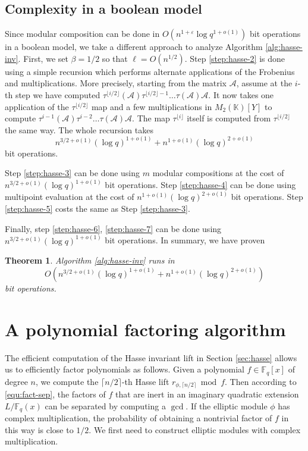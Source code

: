 \documentclass[12pt]{article}
\theoremstyle{plain}
\newtheorem{theorem}{Theorem}
\theoremstyle{definition}
\def\F{\ensuremath{\mathbb{F}}}
\def\K{\ensuremath{\mathbb{K}}}
\begin{document}
\subsection{Complexity in a boolean model}

Since modular composition can be done in $O(n^{1 + \varepsilon}\log q^{1 + o(1)})$ bit operations 
in a boolean model, we take a different approach to analyze Algorithm \ref{alg:hasse-inv}. First,  
we set $\beta = 1/2$ so that $\ell = O(n^{1/2})$. Step \ref{step:hasse-2} is done using a simple 
recursion which performs alternate applications of the Frobenius and multiplications. More 
precisely, starting from the matrix $\mathcal{A}$, assume at the $i$-th step we have computed 
$\tau^{\lfloor i/2 \rfloor}(\mathcal{A}) \tau^{\lfloor i/2 \rfloor-1} \ldots \tau(\mathcal{A}) 
\mathcal{A}$. It now takes one application of the $\tau^{\lfloor i/2 \rfloor}$ map and a few 
multiplications in $M_2(\K)[Y]$ to compute $\tau^{i-1}(\mathcal{A}) \tau^{i-2} \ldots 
\tau(\mathcal{A}) \mathcal{A}$. The map $\tau^{\lfloor i \rfloor}$ itself is computed from
$\tau^{\lfloor i/2 \rfloor}$ the same way. The whole recursion takes
\[ n^{3/2+o(1)} (\log q)^{1+o(1)} + n^{1+o(1)} (\log q)^{2+o(1)} \]
bit operations. 

Step \ref{step:hasse-3} can be done using $m$ modular compositions at the cost of $n^{3/2+o(1)} 
(\log q)^{1+o(1)}$ bit operations. Step \ref{step:hasse-4} can be done using multipoint evaluation 
\cite{vzGG} at the cost of $n^{1+o(1)} (\log q)^{2+o(1)}$ bit operations. Step \ref{step:hasse-5} 
costs the same as Step \ref{step:hasse-3}. 

Finally, step \ref{step:hasse-6}, \ref{step:hasse-7} can be done using $n^{3/2+o(1)} (\log 
q)^{1+o(1)}$ bit operations. In summary, we have proven 
\begin{theorem}
	\label{theo:hasse-inv}
	Algorithm \ref{alg:hasse-inv} runs in 
	\[O(n^{3/2+o(1)} (\log q)^{1+o(1)} + n^{1+o(1)} (\log q)^{2+o(1)})\]
	bit operations.
\end{theorem}



 
 

\section{A polynomial factoring algorithm}
\label{sec:poly-fac}

The efficient computation of the Hasse invariant lift in Section \ref{sec:hasse} allows us to 
efficiently factor polynomials as follows. Given a polynomial $f \in \F_q[x]$ of degree $n$, we 
compute the $\lceil n / 2 \rceil$-th Hasse lift $r_{\phi, \lceil n / 2 \rceil} \bmod f$. Then 
according to \eqref{equ:fact-sep}, the factors of $f$ that are inert in an imaginary quadratic 
extension $L/\F_q(x)$ can be separated by computing a $\gcd$. If the elliptic module $\phi$ has 
complex multiplication, the probability of obtaining a nontrivial factor of $f$ in this way is 
close to $1/2$. We first need to construct elliptic modules with complex multiplication.
\end{document}
